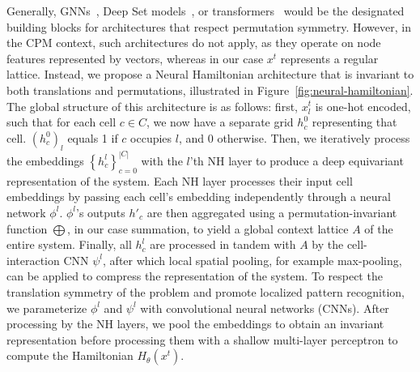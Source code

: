 Generally, GNNs~\cite{Gilmer2017mpgnn, kipf2017gnn}, Deep Set models~\cite{zaheer2017deepset}, or transformers~\cite{vaswani2017transformer} would be the designated building blocks for architectures that respect permutation symmetry. However, in the CPM context, such architectures do not apply, as they operate on node features represented by vectors, whereas in our case $x^t$ represents a regular lattice. Instead, we propose a Neural Hamiltonian architecture that is invariant to both translations and permutations, illustrated in Figure~\ref{fig:neural-hamiltonian}. The global structure of this architecture is as follows: first, $x_l^t$ is one-hot encoded, such that for each cell $c \in C$, we now have a separate grid $h^0_c$ representing that cell. $(h_{c}^0)_l$ equals 1 if $c$ occupies $l$, and 0 otherwise. Then, we iteratively process the embeddings $\left\{h^l_c\right\}_{c=0}^{|C|}$ with the $l$'th NH layer to produce a deep equivariant representation of the system. Each NH layer processes their input cell embeddings by passing each cell's embedding independently through a neural network $\phi^l$. $\phi^l$'s outputs $h'_c$ are then aggregated using a permutation-invariant function $\bigoplus$, in our case summation, to yield a global context lattice $A$ of the entire system. Finally, all $h^l_c$ are processed in tandem with $A$ by the cell-interaction CNN $\psi^l$, after which local spatial pooling, for example max-pooling, can be applied to compress the representation of the system. To respect the translation symmetry of the problem and promote localized pattern recognition, we parameterize $\phi^l$ and $\psi^l$ with convolutional neural networks (CNNs). After processing by the NH layers, we pool the embeddings to obtain an invariant representation before processing them with a shallow multi-layer perceptron to compute the Hamiltonian $H_\theta(x^t)$. 











